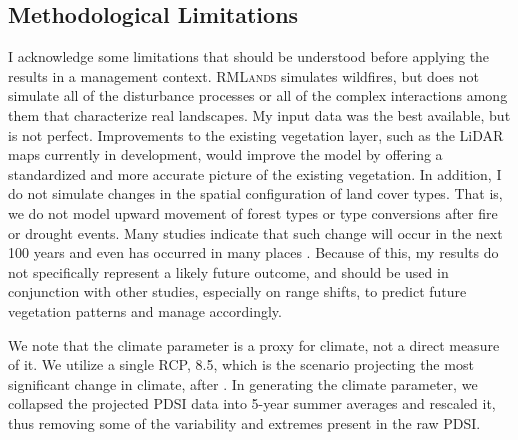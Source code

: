 \subsection*{Methodological Limitations}
I acknowledge some limitations that should be understood before applying the results in a management context. \textsc{RMLands} simulates wildfires, but does not simulate all of the disturbance processes or all of the complex interactions among them that characterize real landscapes. My input data was the best available, but is not perfect. Improvements to the existing vegetation layer, such as the LiDAR maps currently in development, would improve the model by offering a standardized and more accurate picture of the existing vegetation. In addition, I do not simulate changes in the spatial configuration of land cover types. That is, we do not model upward movement of forest types or type conversions after fire or drought events. Many studies indicate that such change will occur in the next 100 years and even has occurred in many places \citep{Bachelet2001}. Because of this, my results do not specifically represent a likely future outcome, and should be used in conjunction with other studies, especially on range shifts, to predict future vegetation patterns and manage accordingly. 

We note that the climate parameter is a proxy for climate, not a direct measure of it. We utilize a single RCP, 8.5, which is the scenario projecting the most significant change in climate, after \citet{Cook2014}. In generating the climate parameter, we collapsed the projected PDSI data into 5-year summer averages and rescaled it, thus removing some of the variability and extremes present in the raw PDSI.












